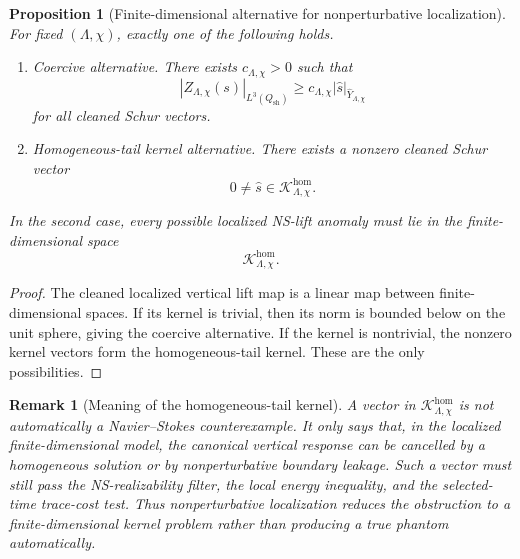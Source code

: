 \documentclass[11pt]{article}
\numberwithin{equation}{section}
\newtheorem{proposition}[theorem]{Proposition}
\newtheorem{remark}[theorem]{Remark}
\begin{document}
\begin{proposition}[Finite-dimensional alternative for nonperturbative localization]
For fixed \((\Lambda,\chi)\), exactly one of the following holds.

\begin{enumerate}
\item \emph{Coercive alternative.} There exists \(c_{\Lambda,\chi}>0\) such that
\[
|Z_{\Lambda,\chi}(s)|_{L^3(Q_{\mathrm{sh}})}
\ge
c_{\Lambda,\chi}|\widehat s|_{\widehat Y_{\Lambda,\chi}}
\]
for all cleaned Schur vectors.

\item \emph{Homogeneous-tail kernel alternative.} There exists a nonzero cleaned Schur vector
\[
0\neq \widehat s\in \mathcal K_{\Lambda,\chi}^{\mathrm{hom}}.
\]
\end{enumerate}

In the second case, every possible localized NS-lift anomaly must lie in the finite-dimensional space
\[
\mathcal K_{\Lambda,\chi}^{\mathrm{hom}}.
\]
\end{proposition}

\begin{proof}
The cleaned localized vertical lift map is a linear map between finite-dimensional spaces. If its kernel is trivial, then its norm is bounded below on the unit sphere, giving the coercive alternative. If the kernel is nontrivial, the nonzero kernel vectors form the homogeneous-tail kernel. These are the only possibilities.
\end{proof}

\begin{remark}[Meaning of the homogeneous-tail kernel]
A vector in \(\mathcal K_{\Lambda,\chi}^{\mathrm{hom}}\) is not automatically a Navier--Stokes counterexample. It only says that, in the localized finite-dimensional model, the canonical vertical response can be cancelled by a homogeneous solution or by nonperturbative boundary leakage. Such a vector must still pass the NS-realizability filter, the local energy inequality, and the selected-time trace-cost test. Thus nonperturbative localization reduces the obstruction to a finite-dimensional kernel problem rather than producing a true phantom automatically.
\end{remark}
\end{document}
